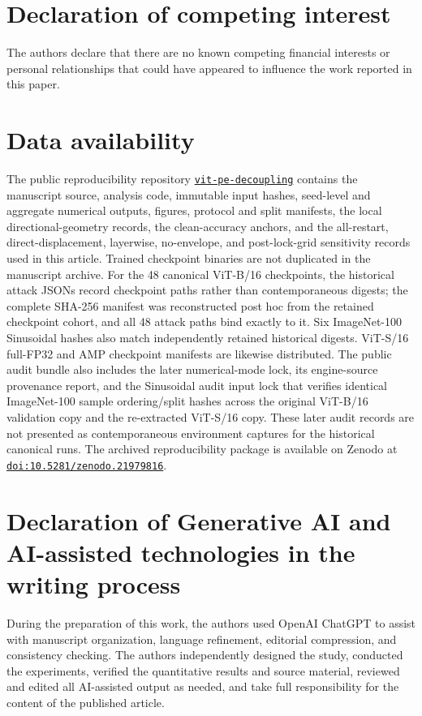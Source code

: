 \documentclass[preprint,12pt,authoryear]{elsarticle}
\begin{document}
\section*{Declaration of competing interest}

The authors declare that there are no known competing financial interests
or personal relationships that could have appeared to influence the work
reported in this paper.


\section*{Data availability}

The public reproducibility repository
\href{https://github.com/djokobandjur/vit-pe-decoupling}{\texttt{vit-pe-decoupling}} contains the manuscript source,
analysis code, immutable input hashes, seed-level and aggregate numerical
outputs, figures, protocol and split manifests, the local directional-geometry
records, the clean-accuracy anchors, and the all-restart, direct-displacement,
layerwise, no-envelope, and post-lock-grid sensitivity records used in this
article.
Trained checkpoint binaries are not duplicated in the manuscript archive.
For the 48 canonical ViT-B/16 checkpoints, the historical attack JSONs record
checkpoint paths rather than contemporaneous digests; the complete SHA-256
manifest was reconstructed post hoc from the retained checkpoint cohort, and
all 48 attack paths bind exactly to it. Six ImageNet-100 Sinusoidal hashes also
match independently retained historical digests. ViT-S/16 full-FP32 and AMP
checkpoint manifests are likewise distributed. The public audit bundle also
includes the later numerical-mode lock, its engine-source provenance report,
and the Sinusoidal audit input lock that verifies identical ImageNet-100 sample
ordering/split hashes across the original ViT-B/16 validation copy and the
re-extracted ViT-S/16 copy. These later audit records are not presented as
contemporaneous environment captures for the historical canonical runs. The archived reproducibility package is available on Zenodo at
\href{https://doi.org/10.5281/zenodo.21979816}
{\texttt{doi:10.5281/zenodo.21979816}}.


\section*{Declaration of Generative AI and AI-assisted technologies in the writing process}

During the preparation of this work, the authors used OpenAI ChatGPT to assist with manuscript organization, language refinement, editorial compression, and consistency checking. The authors independently designed the study, conducted the experiments, verified the quantitative results and source material, reviewed and edited all AI-assisted output as needed, and take full responsibility for the content of the published article.



\end{document}
